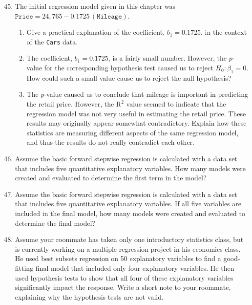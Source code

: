 \documentclass[
]{book}
\begin{document}
\begin{enumerate}
  \setcounter{enumi}{44}

  \item The initial regression model given in this chapter was $\texttt{Price} = 24,\!765 - 0.1725\,(\texttt{Mileage})$.
    \begin{enumerate}
      \item Give a practical explanation of the coefficient, $b_1 = 0.1725$, in the context of the \texttt{Cars} data.
      \item The coefficient, $b_1 = 0.1725$, is a fairly small number. However, the $p$-value for the corresponding hypothesis test caused us to reject $H_0\!: \beta_1 = 0$. How could such a small value cause us to reject the null hypothesis?
      \item The $p$-value caused us to conclude that mileage is important in predicting the retail price. However, the $\mathrm{R}^2$ value seemed to indicate that the regression model was not very useful in estimating the retail price. These results may originally appear somewhat contradictory. Explain how these statistics are measuring different aspects of the same regression model, and thus the results do not really contradict each other.
    \end{enumerate}

  \item Assume the basic forward stepwise regression is calculated with a data set that includes five quantitative explanatory variables. How many models were created and evaluated to determine the first term in the model?

  \item Assume the basic forward stepwise regression is calculated with a data set that includes five quantitative explanatory variables. If all five variables are included in the final model, how many models were created and evaluated to determine the final model?

  \item Assume your roommate has taken only one introductory statistics class, but is currently working on a multiple regression project in his economics class. He used best subsets regression on 50 explanatory variables to find a good-fitting final model that included only four explanatory variables. He then used hypothesis tests to show that all four of these explanatory variables significantly impact the response. Write a short note to your roommate, explaining why the hypothesis tests are not valid.


\end{enumerate}
\end{document}

